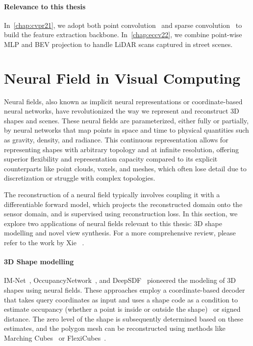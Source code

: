\paragraph{Relevance to this thesis} In~\cref{chap:cvpr21}, we adopt both point convolution~\cite{thomas2019kpconv} and sparse convolution~\cite{choy2019Minkowski} to build the feature extraction backbone. In~\cref{chap:eccv22}, we combine point-wise MLP and BEV projection to handle LiDAR scans captured in street scenes. 


\section{Neural Field in Visual Computing}
\label{sec:bg_neural_field}
Neural fields, also known as implicit neural representations or coordinate-based neural networks, have revolutionized the way we represent and reconstruct 3D shapes and scenes. These neural fields are parameterized, either fully or partially, by neural networks that map points in space and time to physical quantities such as gravity, density, and radiance. This continuous representation allows for representing shapes with arbitrary topology and at infinite resolution, offering superior flexibility and representation capacity compared to its explicit counterparts like point clouds, voxels, and meshes, which often lose detail due to discretization or struggle with complex topologies.

The reconstruction of a neural field typically involves coupling it with a differentiable forward model, which projects the reconstructed domain onto the sensor domain, and is supervised using reconstruction loss. In this section, we explore two applications of neural fields relevant to this thesis: 3D shape modelling and novel view synthesis. For a more comprehensive review, please refer to the work by Xie \etal~\cite{xie2022neural}.

\paragraph{3D Shape modelling}
IM-Net~\cite{chen2019learning}, OccupancyNetwork~\cite{mescheder2019occupancy}, and DeepSDF~\cite{park2019deepsdf} pioneered the modeling of 3D shapes using neural fields. These approaches employ a coordinate-based decoder that takes query coordinates as input and uses a shape code as a condition to estimate occupancy (whether a point is inside or outside the shape)~\cite{mescheder2019occupancy, chen2019learning} or signed distance\cite{park2019deepsdf}. The zero level of the shape is subsequently determined based on these estimates, and the polygon mesh can be reconstructed using methods like Marching Cubes~\cite{levoy1990efficient} or FlexiCubes~\cite{shen2023flexible}.

